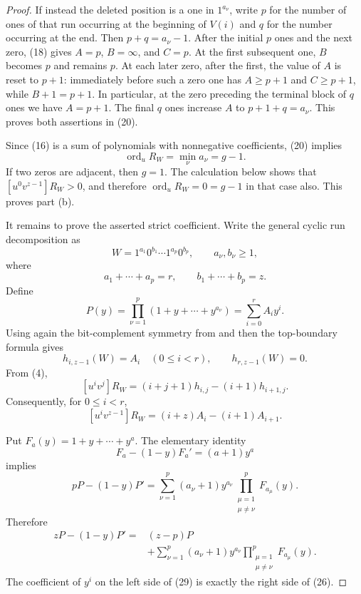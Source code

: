 \documentclass[11pt]{article}
\newcommand{\ord}{\operatorname{ord}}
\begin{document}
\begin{proof}
If instead the deleted position is a one in $1^{a_\nu}$, write
$p$ for the number of ones of that run occurring at the beginning of
$V(i)$ and $q$ for the number occurring at the end.  Then
$p+q=a_\nu-1$.  After the initial $p$ ones and the next zero, (18)
gives $A=p$, $B=\infty$, and $C=p$.  At the first subsequent one,
$B$ becomes $p$ and remains $p$.  At each later zero, after the first,
the value of $A$ is reset to $p+1$: immediately before such a zero one
has $A\ge p+1$ and $C\ge p+1$, while $B+1=p+1$.  In particular, at
the zero preceding the terminal block of $q$ ones we have $A=p+1$.
The final $q$ ones increase $A$ to
$p+1+q=a_\nu$.  This proves both assertions in (20).

Since (16) is a sum of polynomials with nonnegative coefficients, (20)
implies
\[
                    \ord_uR_W=\min_\nu a_\nu=g-1.             \tag{21}
\]
If two zeros are adjacent, then $g=1$.  The calculation below shows
that $[u^0v^{z-1}]R_W>0$, and therefore $\ord_uR_W=0=g-1$ in
that case also.  This proves part (b).

It remains to prove the asserted strict coefficient.  Write the general
cyclic run decomposition as
\[
              W=1^{a_1}0^{b_1}\cdots1^{a_p}0^{b_p},
              \qquad a_\nu,b_\nu\geq1,                       \tag{22}
\]
where
\[
              a_1+\cdots+a_p=r,\qquad
              b_1+\cdots+b_p=z.
\]
Define
\[
 P(y)=\prod_{\nu=1}^{p}(1+y+\cdots+y^{a_\nu})
      =\sum_{i=0}^{r}A_i y^i.                                \tag{23}
\]
Using again the bit-complement symmetry from \cite[proof of Theorem 5.2]{Proof}
and then the top-boundary formula \cite[Theorem 8.3, equation (43)]{Proof}
gives
\[
 h_{i,z-1}(W)=A_i\quad(0\leq i<r),
 \qquad h_{r,z-1}(W)=0.                                     \tag{24}
\]
From (4),
\[
 [u^iv^j]R_W=(i+j+1)h_{i,j}-(i+1)h_{i+1,j}.                 \tag{25}
\]
Consequently, for $0\leq i<r$,
\[
 [u^iv^{z-1}]R_W=(i+z)A_i-(i+1)A_{i+1}.                    \tag{26}
\]

Put $F_a(y)=1+y+\cdots+y^a$.  The elementary identity
\[
                 F_a-(1-y)F_a'=(a+1)y^a                    \tag{27}
\]
implies
\[
 pP-(1-y)P'
 =\sum_{\nu=1}^{p}(a_\nu+1)y^{a_\nu}
       \prod_{\substack{\mu=1\\\mu\ne\nu}}^{p}F_{a_\mu}(y).
                                                                    \tag{28}
\]
Therefore
\[
\begin{split}
 zP-(1-y)P'
  ={}&(z-p)P\\
   &+\sum_{\nu=1}^{p}(a_\nu+1)y^{a_\nu}
       \prod_{\substack{\mu=1\\\mu\ne\nu}}^{p}F_{a_\mu}(y).
\end{split}                                                       \tag{29}
\]
The coefficient of $y^i$ on the left side of (29) is exactly the
right side of (26).


\end{proof}
\end{document}

